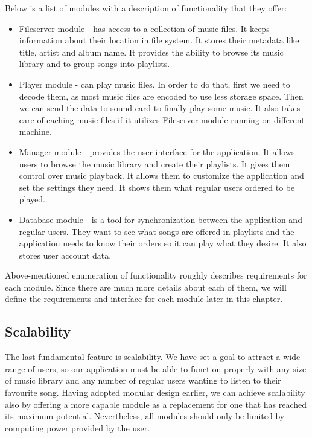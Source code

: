 \par
Below is a list of modules with a description of functionality that they offer:
\begin{itemize}
    \item Fileserver module - has access to a collection of music files. It keeps information about their location in file system. It stores their metadata like title, artist and album name. It provides the ability to browse its music library and to group songs into playlists.
    \item Player module - can play music files. In order to do that, first we need to decode them, as most music files are encoded to use less storage space. Then we can send the data to sound card to finally play some music. It also takes care of caching music files if it utilizes Fileserver module running on different machine.
    \item Manager module - provides the user interface for the application. It allows users to browse the music library and create their playlists. It gives them control over music playback. It allows them to customize the application and set the settings they need. It shows them what regular users ordered to be played.
    \item Database module - is a tool for synchronization between the application and regular users. They want to see what songs are offered in playlists and the application needs to know their orders so it can play what they desire. It also stores user account data.
\end{itemize}
Above-mentioned enumeration of functionality roughly describes requirements for each module. Since there are much more details about each of them, we will define the requirements and interface for each module later in this chapter.

\subsection{Scalability}

The last fundamental feature is scalability. We have set a goal to attract a wide range of users, so our application must be able to function properly with any size of music library and any number of regular users wanting to listen to their favourite song. Having adopted modular design earlier, we can achieve scalability also by offering a more capable module as a replacement for one that has reached its maximum potential. Nevertheless, all modules should only be limited by computing power provided by the user.

